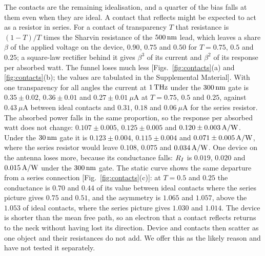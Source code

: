 The contacts are the remaining idealisation, and a quarter of the bias
falls at them even when they are ideal. A contact that reflects might be
expected to act as a resistor in series. For a contact of transparency
$T$ that resistance is $(1-T)/T$ times the Sharvin resistance of the
$500\,\mathrm{nm}$ lead, which leaves a share $\beta$ of the applied voltage on the
device, $0.90$, $0.75$ and $0.50$ for $T=0.75$, $0.5$ and $0.25$; a
square-law rectifier behind it gives $\beta^{3}$ of its current and
$\beta^{2}$ of its response per absorbed watt. The funnel loses much less
[Figs.~\ref{fig:contacts}(a) and \ref{fig:contacts}(b); the values are
tabulated in the Supplemental Material]. With one
transparency for all angles the current at $1\,\mathrm{THz}$ under the $300\,\mathrm{nm}$
gate is $0.35\pm0.02$, $0.36\pm0.01$ and $0.27\pm0.01\ \mu$A at $T=0.75$,
$0.5$ and $0.25$, against $0.43\ \mu$A between ideal contacts and $0.31$,
$0.18$ and $0.06\ \mu$A for the series resistor. The absorbed power
falls in the same proportion, so the response
per absorbed watt does not change: $0.107\pm0.005$, $0.125\pm0.005$ and
$0.120\pm0.003\,\mathrm{A/W}$. Under the $30\,\mathrm{nm}$ gate it is $0.123\pm0.004$,
$0.115\pm0.004$ and $0.071\pm0.005\,\mathrm{A/W}$, where the series resistor would
leave $0.108$, $0.075$ and $0.034\,\mathrm{A/W}$. One device on the antenna loses
more, because its conductance falls: $R_{I}$ is $0.019$, $0.020$ and
$0.015\,\mathrm{A/W}$ under the $300\,\mathrm{nm}$ gate. The static curve shows the same
departure from a series connection [Fig.~\ref{fig:contacts}(c)]: at
$T=0.5$ and $0.25$ the conductance is $0.70$
and $0.44$ of its value between ideal contacts where the series picture
gives $0.75$ and $0.51$, and the asymmetry is $1.065$ and $1.057$,
above the $1.053$ of ideal contacts, where the series picture gives
$1.030$ and $1.014$. The device is shorter than the mean free path, so
an electron that a contact reflects returns to the neck without having
lost its direction. Device and contacts then scatter as one object and
their resistances do not add. We offer this as the likely reason and
have not tested it separately.

